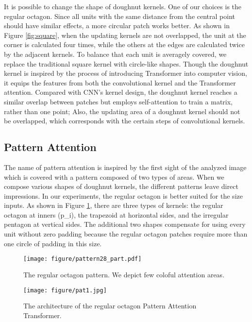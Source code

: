 \documentclass{article}
\theoremstyle{plain}
\theoremstyle{definition}
\theoremstyle{remark}
\begin{document}
It is possible to change the shape of doughnut kernels. One of our choices is the regular octagon. Since all units with the same distance from the central point should have similar effects, a more circular patch works better. As shown in Figure \ref{fig:square}, when the updating kernels are not overlapped, the unit at the corner is calculated four times, while the others at the edges are calculated twice by the adjacent kernels. To balance that each unit is averagely covered, we replace the traditional square kernel with circle-like shapes. 
Though the doughnut kernel is inspired by the process of introducing Transformer into computer vision, it equips the features from both the convolutional kernel and the Transformer attention. Compared with CNN’s kernel design, the doughnut kernel reaches a similar overlap between patches but employs self-attention to train a matrix, rather than one point; Also, the updating area of a doughnut kernel should not be overlapped, which corresponds with the certain steps of convolutional kernels.

\subsection{Pattern Attention}
The name of pattern attention is inspired by the first sight of the analyzed image which is covered with a pattern composed of two types of areas. When we compose various shapes of doughnut kernels, the different patterns leave direct impressions. In our experiments, the regular octagon is better suited for the  size inputs. As shown in Figure \ref{fig:pattern28part}, there are three types of kernels: the regular octagon at inners (p\_i), the trapezoid at horizontal sides, and the irregular pentagon at vertical sides. The additional two shapes compensate for using every unit without zero padding because the regular octagon patches require more than one circle of padding in this size.

\begin{figure}[h]
\centering
    \texttt{[image: figure/pattern28\_part.pdf]}
\caption{The regular octagon pattern. We depict few coloful attention areas.}
\label{fig:pattern28part}
\end{figure}

\begin{figure*}[ht]
\vskip 0.15in
\centering
    \texttt{[image: figure/pat1.jpg]}
\caption{The architecture of the regular octagon Pattern Attention Transformer.}
\label{fig:pat1}
\vskip 0.1in
\end{figure*}
\end{document}
